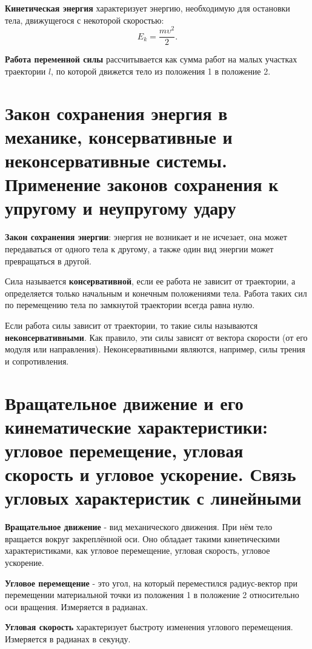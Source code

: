 \textbf{Кинетическая энергия} характеризует энергию, необходимую для
остановки тела, движущегося с некоторой скоростью: \[
  E_k = \frac{m \upsilon^2}{2}
.\]

\textbf{Работа переменной силы} рассчитывается как сумма работ на малых
участках траектории $l$, по которой движется тело из положения 1 в положение 2.

\section[пятый вопрос]{Закон сохранения энергия в механике, консервативные и
  неконсервативные системы. Применение законов сохранения к упругому и
неупругому удару}

\textbf{Закон сохранения энергии}: энергия не возникает и не исчезает, она
может передаваться от одного тела к другому, а также один вид энергии может
превращаться в другой.

Сила называется \textbf{консервативной}, если ее работа не зависит от
траектории, а определяется только начальным и конечным положениями тела. Работа
таких сил по перемещению тела по замкнутой траектории всегда равна нулю.

Если работа силы зависит от траектории, то такие силы называются
\textbf{неконсервативными}. Как правило, эти силы зависят от вектора скорости
(от его модуля или направления). Неконсервативными являются, например, силы
трения и сопротивления.


\section[шестой вопрос]{Вращательное движение и его кинематические
  характеристики: угловое перемещение, угловая скорость и угловое ускорение.
Связь угловых характеристик с линейными}

\textbf{Вращательное движение} - вид механического движения. При нём тело
вращается вокруг закреплённой оси. Оно обладает такими кинетическими
характеристиками, как угловое перемещение, угловая скорость, угловое ускорение.

\textbf{Угловое перемещение} - это угол, на который переместился радиус-вектор
при перемещении материальной точки из положения 1 в положение 2 относительно
оси вращения. Измеряется в радианах.

\textbf{Угловая скорость} характеризует быстроту изменения углового перемещения.
Измеряется в радианах в секунду.

